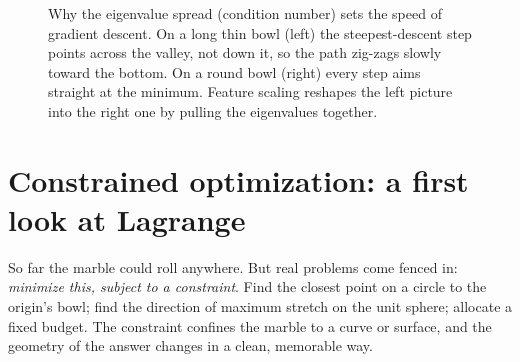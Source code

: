 \begin{figure}[H]
\centering
{}
\caption{Why the eigenvalue spread (condition number) sets the speed of gradient
descent. On a long thin bowl (left) the steepest-descent step points across the valley,
not down it, so the path zig-zags slowly toward the bottom. On a round bowl (right)
every step aims straight at the minimum. Feature scaling reshapes the left picture into
the right one by pulling the eigenvalues together.}
\label{ch36:fig-condition}
\end{figure}

\section{Constrained optimization: a first look at Lagrange}
\label{ch36:lagrange}

So far the marble could roll anywhere. But real problems come fenced in:
\emph{minimize this, subject to a constraint}. Find the closest point on a circle to
the origin's bowl; find the direction of maximum stretch on the unit sphere; allocate
a fixed budget. The constraint confines the marble to a curve or surface, and the
geometry of the answer changes in a clean, memorable way.

